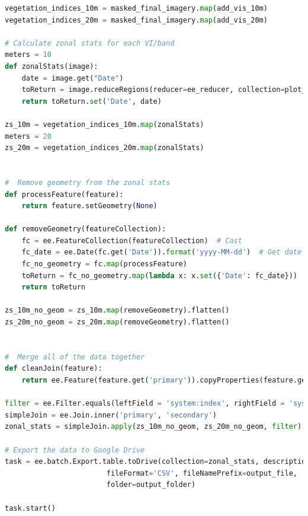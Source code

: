 \documentclass{article}
\begin{document}
\begin{lstlisting}[language=Python]
vegetation_indices_10m = masked_final_imagery.map(add_vis_10m)
vegetation_indices_20m = masked_final_imagery.map(add_vis_20m)

# Calculate zonal stats for each VI/band
meters = 10 
def zonalStats(image):
    date = image.get("Date")
    toReturn = image.reduceRegions(reducer=ee_reducer, collection=plot_boundaries, scale=meters)
    return toReturn.set('Date', date)

zs_10m = vegetation_indices_10m.map(zonalStats)
meters = 20 
zs_20m = vegetation_indices_20m.map(zonalStats)


#  Remove geometry from the zonal stats
def processFeature(feature):
    return feature.setGeometry(None)

def removeGeometry(featureCollection):
    fc = ee.FeatureCollection(featureCollection)  # Cast
    fc_date = ee.Date(fc.get('Date')).format('yyyy-MM-dd')  # Get date to assign
    fc_no_geometry = fc.map(processFeature)
    toReturn = fc_no_geometry.map(lambda x: x.set({'Date': fc_date}))
    return toReturn

zs_10m_no_geom = zs_10m.map(removeGeometry).flatten()
zs_20m_no_geom = zs_20m.map(removeGeometry).flatten()


#  Merge all of the data together 
def cleanJoin(feature):
    return ee.Feature(feature.get('primary')).copyProperties(feature.get('secondary'))

filter = ee.Filter.equals(leftField = 'system:index', rightField = 'system:index')
simpleJoin = ee.Join.inner('primary', 'secondary')
zonal_stats = simpleJoin.apply(zs_10m_no_geom, zs_20m_no_geom, filter).map(cleanJoin)

# Export the data to Google Drive
task = ee.batch.Export.table.toDrive(collection=zonal_stats, description=output_file, 
                        fileFormat='CSV', fileNamePrefix=output_file,
                        folder=output_folder)

task.start()    

\end{lstlisting}
\end{document}
